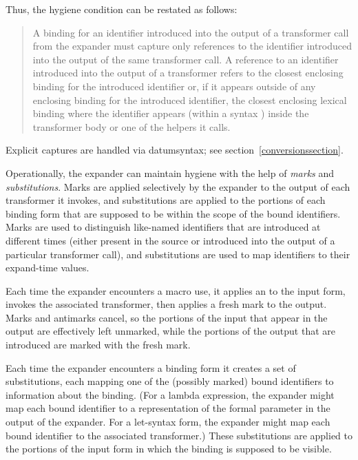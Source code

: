 Thus, the hygiene condition can be restated as follows:

\begin{quotation}
\noindent
A binding for an identifier introduced into the output of a transformer
call from the expander must capture only references to the identifier
introduced into the output of the same transformer call.
A reference to an identifier introduced into the output of a transformer
refers to the closest enclosing binding for the introduced identifier or,
if it appears outside of any enclosing binding for the introduced
identifier, the closest enclosing lexical binding where the identifier
appears (within a {\cf syntax} )
inside the transformer body or one of the helpers it calls.
\end{quotation}

Explicit captures are handled via {\cf datum\coerce{}syntax}; see
section~\ref{conversionssection}.

Operationally, the expander can maintain hygiene with the help of
\emph{marks} and \emph{substitutions}.
Marks are applied selectively by the expander to the output of each
transformer it invokes, and substitutions are applied to the portions
of each binding form that are supposed to be within the scope of the bound
identifiers.
Marks are used to distinguish like-named identifiers that are
introduced at different times (either present in the source or introduced
into the output of a particular transformer call), and substitutions are
used to map identifiers to their expand-time values.

Each time the expander encounters a macro use, it applies an
 to the input form, invokes the associated transformer,
then applies a fresh mark to the output.
Marks and antimarks cancel, so the portions of the input that appear in
the output are effectively left unmarked, while the portions of the output
that are introduced are marked with the fresh mark.

Each time the expander encounters a binding form it creates a set of
substitutions, each mapping one of the (possibly marked) bound identifiers
to information about the binding.
(For a {\cf lambda} expression, the expander might map each bound
identifier to a representation of the formal parameter in the output of
the expander.
For a {\cf let-syntax} form, the expander might map each bound
identifier to the associated transformer.)
These substitutions are applied to the portions of the input form in
which the binding is supposed to be visible.

